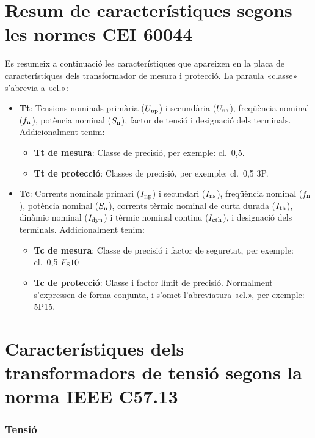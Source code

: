 \section{Resum de característiques segons les normes CEI 60044}

Es resumeix a continuació les característiques que apareixen en la placa de característiques dels transformador de mesura i protecció. La paraula
«classe» s'abrevia a «cl.»:

\begin{itemize}
   \item \textbf{Tt}: Tensions nominals  primària ($U_\mathrm{np}$) i secundària ($U_\mathrm{ns}$), freqüència nominal ($f_\mathrm{n}$),
    potència nominal ($S_\mathrm{n}$), factor de tensió i     designació dels terminals. Addicionalment tenim:
       \begin{itemize}
           \item \textbf{Tt de mesura}: Classe de precisió, per  exemple: cl.~0,5.
           \item \textbf{Tt de protecció}: Classes de precisió, per  exemple: cl.~0,5 3P.
        \end{itemize}
    \item \textbf{Tc}: Corrents nominals primari ($I_\mathrm{np}$) i secundari ($I_\mathrm{ns}$), freqüència nominal ($f_\mathrm{n}$),
     potència nominal ($S_\mathrm{n}$),  corrents tèrmic nominal de curta durada ($I_\mathrm{th}$), dinàmic nominal ($I_\mathrm{dyn}$) i tèrmic nominal continu ($I_\mathrm{cth}$), i     designació dels terminals. Addicionalment tenim:
        \begin{itemize}
           \item \textbf{Tc de mesura}: Classe de precisió i factor de seguretat, per exemple: cl.~0,5 $F_\mathrm{S} 10$
           \item \textbf{Tc de protecció}: Classe i factor límit de precisió. Normalment s'expressen de forma conjunta, i s'omet l'abreviatura «cl.»,  per exemple: 5P15.
        \end{itemize}
\end{itemize}


\section{Característiques dels transformadors de tensió segons la norma IEEE C57.13}

\subsubsection{Tensió}


